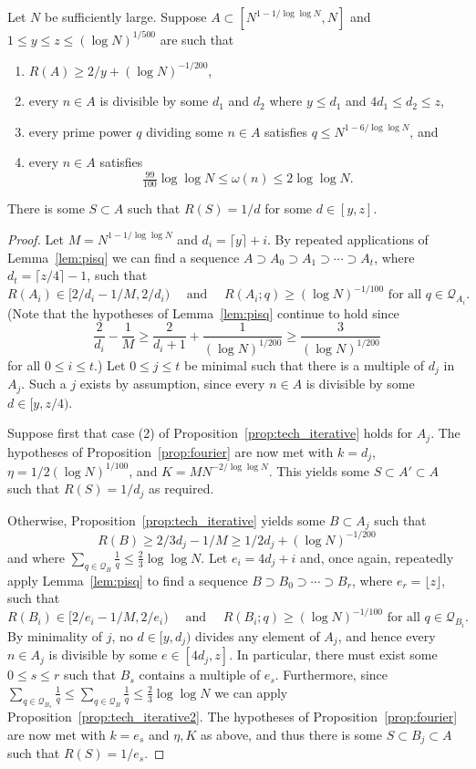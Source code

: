 \begin{proposition}\label{prop:techmain}
\leanok
{}
Let $N$ be sufficiently large. Suppose $A\subset [N^{1-1/\log\log N},N]$ and $1\leq y\leq z\leq (\log N)^{1/500}$ are such that
\begin{enumerate}
\item $R(A)\geq 2/y+(\log N)^{-1/200}$,
\item every $n\in A$ is divisible by some $d_1$ and $d_2$ where $y\leq d_1$ and $4d_1\leq d_2\leq z$,
\item every prime power $q$ dividing some $n\in A$ satisfies $q\leq N^{1-6/\log\log N}$, and
\item every $n\in A$ satisfies
\[\tfrac{99}{100}\log\log N\leq \omega(n) \leq 2\log\log N.\]
\end{enumerate}
There is some $S\subset A$ such that $R(S)=1/d$ for some $d\in [y,z]$.
\end{proposition}
\begin{proof}
Let $M=N^{1-1/\log\log N}$ and $d_i = \lceil y \rceil +i$. By repeated applications of Lemma~\ref{lem:pisq} we can find a sequence $A\supset A_0\supset A_1\supset\cdots \supset A_{t}$, where $d_t=\lceil z/4\rceil-1$, such that
\[R(A_i)\in [2/d_i-1/M,2/d_i)\quad\textrm{ and }\quad R(A_i;q)\geq (\log N)^{-1/100}\textrm{ for all }q\in \mathcal{Q}_{A_i}.\]
(Note that the hypotheses of Lemma~\ref{lem:pisq} continue to hold since
\[\frac{2}{d_i}-\frac{1}{M}\geq \frac{2}{d_{i}+1}+\frac{1}{(\log N)^{1/200}}\geq \frac{3}{(\log N)^{1/200}}\]
for all $0\leq i\leq t$.) Let $0\leq j\leq t$ be minimal such that there is a multiple of $d_j$ in $A_j$. Such a $j$ exists by assumption, since every $n\in A$ is divisible by some $d\in[y,z/4)$.

Suppose first that case (2) of Proposition~\ref{prop:tech_iterative} holds for $A_j$. The hypotheses of Proposition~\ref{prop:fourier} are now met with $k=d_j$, $\eta=1/2(\log N)^{1/100}$, and $K=MN^{-2/\log \log N}$. This yields some $S\subset A'\subset A$ such that $R(S)=1/d_j$ as required.

Otherwise, Proposition~\ref{prop:tech_iterative} yields some $B\subset A_j$ such that
\[R(B)\geq 2/3d_j-1/M\geq 1/2d_j+(\log N)^{-1/200}\]
and where $\sum_{q\in\mathcal{Q}_B}\frac{1}{q}\leq \frac{2}{3}\log\log N$. Let $e_i = 4d_j+i$ and, once again, repeatedly apply Lemma~\ref{lem:pisq} to find a sequence $B\supset B_0\supset \cdots\supset B_r$, where $e_r=\lfloor z\rfloor$, such that
\[R(B_i)\in [2/e_i-1/M,2/e_i)\quad\textrm{ and }\quad R(B_i;q)\geq (\log N)^{-1/100}\textrm{ for all }q\in \mathcal{Q}_{B_i}.\]
By minimality of $j$, no $d\in [y,d_j)$ divides any element of $A_j$, and hence every $n\in A_j$ is divisible by some $e\in [4d_j,z]$. In particular, there must exist some $0\leq s\leq r$ such that $B_s$ contains a multiple of $e_s$. Furthermore, since $\sum_{q\in \mathcal{Q}_{B_s}}\frac{1}{q}\leq \sum_{q\in\mathcal{Q}_B}\frac{1}{q}\leq \frac{2}{3}\log\log N$ we can apply Proposition~\ref{prop:tech_iterative2}. The hypotheses of Proposition~\ref{prop:fourier} are now met with $k=e_s$ and $\eta,K$ as above, and thus there is some $S\subset B_j\subset A$ such that $R(S)=1/e_s$.
\end{proof}